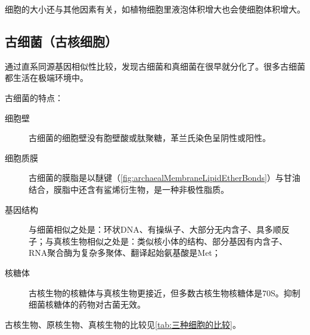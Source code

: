 细胞的大小还与其他因素有关，如植物细胞里液泡体积增大也会使细胞体积增大。

\subsection{古细菌（古核细胞）}

通过直系同源基因相似性比较，发现古细菌和真细菌在很早就分化了。很多古细菌都生活在极端环境中。

古细菌的特点：

\begin{description}
	\item[细胞壁] 古细菌的细胞壁没有胞壁酸或肽聚糖，革兰氏染色呈阴性或阳性。
	\item[细胞质膜] 古细菌的膜脂是以醚键（\autoref{fig:archaealMembraneLipidEtherBonds}）与甘油结合，膜脂中还含有鲨烯衍生物，是一种非极性脂质。
	\item[基因结构] 与细菌相似之处是：环状DNA、有操纵子、大部分无内含子、具多顺反子；与真核生物相似之处是：类似核小体的结构、部分基因有内含子、RNA聚合酶为复杂多聚体、翻译起始氨基酸是Met；
	\item[核糖体] 古核生物的核糖体与真核生物更接近，但多数古核生物核糖体是70S。抑制细菌核糖体的药物对古菌无效。
\end{description}

古核生物、原核生物、真核生物的比较见\autoref{tab:三种细胞的比较}。

